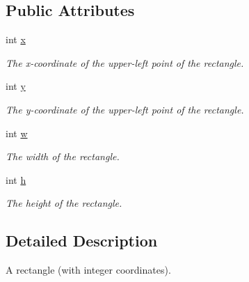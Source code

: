 \subsection*{Public Attributes}
\begin{DoxyCompactItemize}
\item 
\mbox{\label{structlib_c_z_i_1_1_int_rect_a7a1e25fc9f6a4c99d9a3710446b7a5de}} 
int \hyperlink{structlib_c_z_i_1_1_int_rect_a7a1e25fc9f6a4c99d9a3710446b7a5de}{x}
\begin{DoxyCompactList}\small\item\em The x-\/coordinate of the upper-\/left point of the rectangle. \end{DoxyCompactList}\item 
\mbox{\label{structlib_c_z_i_1_1_int_rect_a68521052e5725a4b6538fb81c3706383}} 
int \hyperlink{structlib_c_z_i_1_1_int_rect_a68521052e5725a4b6538fb81c3706383}{y}
\begin{DoxyCompactList}\small\item\em The y-\/coordinate of the upper-\/left point of the rectangle. \end{DoxyCompactList}\item 
\mbox{\label{structlib_c_z_i_1_1_int_rect_ad83af8b748b2fdbf5ac96ff1773e623b}} 
int \hyperlink{structlib_c_z_i_1_1_int_rect_ad83af8b748b2fdbf5ac96ff1773e623b}{w}
\begin{DoxyCompactList}\small\item\em The width of the rectangle. \end{DoxyCompactList}\item 
\mbox{\label{structlib_c_z_i_1_1_int_rect_a59e7b7e0a9190fae3973e2da2bf7d173}} 
int \hyperlink{structlib_c_z_i_1_1_int_rect_a59e7b7e0a9190fae3973e2da2bf7d173}{h}
\begin{DoxyCompactList}\small\item\em The height of the rectangle. \end{DoxyCompactList}\end{DoxyCompactItemize}


\subsection{Detailed Description}
A rectangle (with integer coordinates). 

